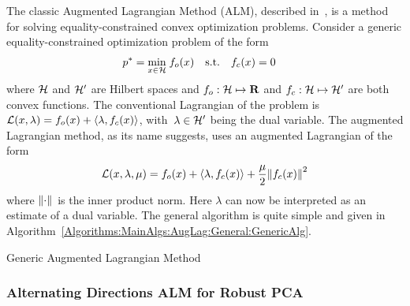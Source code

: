 \documentclass{../../common/projectreport}
\begin{document}
The classic Augmented Lagrangian Method (ALM), described in~\cite{Bertsekas:1996fk}, is a method for solving equality-constrained convex optimization problems. Consider a generic equality-constrained optimization problem of the form
%
\begin{align}
p^* = \min_{x\in{\mathcal{H}}} \;&f_o(x) \quad \text{s.t.} \quad f_c(x) =0
\label{Algorithms:MainAlgs:AugLag:General:GenericProb}
\end{align}
%
where ${\mathcal{H}}$ and ${\mathcal{H}}'$ are Hilbert spaces and $f_o:{\mathcal{H}} \mapsto {\mathbf R}$ and $f_c:{\mathcal{H}} \mapsto {\mathcal{H}}'$ are both convex functions. The conventional Lagrangian of the problem is ${\mathcal{L}}(x,\lambda) = f_o(x) + \langle \lambda, f_c(x) \rangle$, with~$\lambda\in{\mathcal{H}}'$ being the dual variable. The augmented Lagrangian method, as its name suggests, uses an augmented Lagrangian of the form 
%
\begin{align}
{\mathcal{L}}(x,\lambda,\mu) = f_o(x) + \langle \lambda, f_c(x) \rangle + \frac{\mu}{2} {\left\|f_c(x)\right\|}_{}^{2}
\label{Algorithms:MainAlgs:AugLag:General:GenAugLagr}
\end{align}
%
where ${\left\|\cdot\right\|}_{}^{}$ is the inner product norm. Here $\lambda$ can now be interpreted as an estimate of a dual variable. The general algorithm is quite simple and given in Algorithm~\ref{Algorithms:MainAlgs:AugLag:General:GenericAlg}.
%
\begin{algorithm}
\caption{Generic Augmented Lagrangian Method}
\label{Algorithms:MainAlgs:AugLag:General:GenericAlg}
\end{algorithm}


\subsubsection{Alternating Directions ALM for Robust PCA}
\label{Algorithms:MainAlgs:AugLag:RPCA:Subsubsec}
\end{document}
